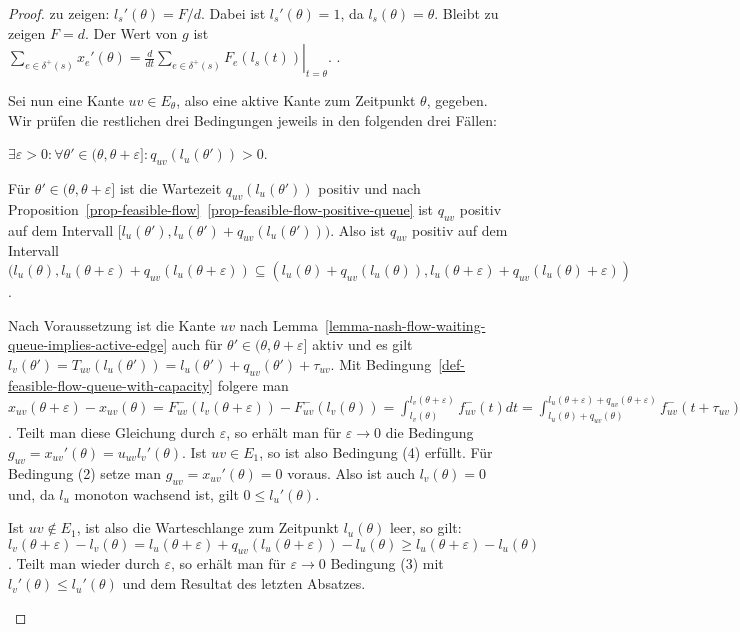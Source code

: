 \begin{proof}
	zu zeigen: $l_s'(\theta) = F/d$.
	Dabei ist $l_s'(\theta) = 1$, da $l_s(\theta) = \theta$. Bleibt zu zeigen $F= d$.
	Der Wert von $g$ ist $\sum_{e\in\delta^+(s)}x_e'(\theta) =  \left.\frac{d}{dt}\sum_{e\in\delta^+(s)}F_e(l_s(t))\right|_{t=\theta}$. .
	
	Sei nun eine Kante $uv\in E_\theta$, also eine aktive Kante zum Zeitpunkt $\theta$, gegeben. Wir prüfen die restlichen drei Bedingungen jeweils in den folgenden drei Fällen:
	
	\begin{description}[leftmargin=0cm, topsep=0cm, itemindent=\parindent]
		\item[1. Fall:] $\exists \varepsilon > 0:\forall \theta'\in (\theta, \theta + \varepsilon ] : q_{uv}(l_u(\theta')) > 0$.
		
		Für $\theta'\in(\theta,\theta+\varepsilon]$ ist die Wartezeit $q_{uv}(l_u(\theta'))$ positiv und nach Proposition~\ref{prop-feasible-flow}~\ref{prop-feasible-flow-positive-queue} ist $q_{uv}$ positiv auf dem Intervall $[ l_u(\theta')  , l_u(\theta')+q_{uv}(l_u(\theta')) )$.
		Also ist $q_{uv}$ positiv auf dem Intervall $( l_u(\theta) , l_u(\theta + \varepsilon) + q_{uv}(l_u(\theta + \varepsilon) )
		\subseteq ( l_u(\theta) + q_{uv}(l_u(\theta)) , l_u(\theta + \varepsilon) + q_{uv}(l_u(\theta) + \varepsilon ) )$.
		
		Nach Voraussetzung ist die Kante ${uv}$ nach Lemma~\ref{lemma-nash-flow-waiting-queue-implies-active-edge} auch für $\theta'\in  (\theta, \theta + \varepsilon ]$ aktiv und es gilt $l_v(\theta') = T_{uv}(l_u(\theta')) = l_u(\theta') + q_{uv}(\theta') + \tau_{uv}$.
		Mit Bedingung~\ref{def-feasible-flow-queue-with-capacity} folgere man $x_{uv}(\theta + \varepsilon) - x_{uv}(\theta) = F_{uv}^-(l_v(\theta + \varepsilon)) - F_{uv}^-(l_v(\theta))
		= \int_{l_v(\theta)}^{l_v(\theta + \varepsilon)} f_{uv}^-(t) dt
		= \int_{l_u(\theta) + q_{uv}(\theta)}^{l_u(\theta + \varepsilon) + q_{uv}(\theta + \varepsilon)} f_{uv}^-(t + \tau_{uv}) dt
		= u_{uv} (l_v(\theta + \varepsilon) - l_v(\theta))$.
		Teilt man diese Gleichung durch $\varepsilon$, so erhält man für $\varepsilon\rightarrow 0$ die Bedingung $g_{uv} = x_{uv}'(\theta) = u_{uv} l_v'(\theta)$.
		Ist $uv\in E_1$, so ist also Bedingung (4) erfüllt.
		Für Bedingung (2) setze man $g_{uv}=x_{uv}'(\theta)=0$ voraus.
		Also ist auch $l_v(\theta)=0$ und, da $l_u$ monoton wachsend ist, gilt $0 \leq l_u'(\theta)$.

		Ist $uv\notin E_1$, ist also die Warteschlange zum Zeitpunkt $l_u(\theta)$ leer, so gilt: $l_v(\theta+\varepsilon) - l_v(\theta) = l_u(\theta + \varepsilon) + q_{uv}(l_u(\theta + \varepsilon)) - l_u(\theta) \geq l_u(\theta + \varepsilon) - l_u(\theta)$.
		Teilt man wieder durch $\varepsilon$, so erhält man für $\varepsilon  \rightarrow 0$ Bedingung (3) mit $l_v'(\theta) \leq l_u'(\theta)$ und dem Resultat des letzten Absatzes.
		

\end{description}
\end{proof}
